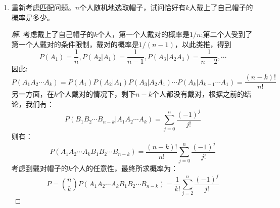 \documentclass[12pt]{article}
\newcommand{\hei}{\CJKfamily{hei}}                          %
\begin{document}
\begin{enumerate}
\item {\hei 重新考虑匹配问题。$n$个人随机地选取帽子，试问恰好有$k$人戴上了自己帽子的概率是多少。}
\begin{proof}[解]
	考虑戴上了自己帽子的$k$个人，第一个人戴对的概率是$1/n$;第二个人受到了第一个人戴对的条件限制，戴对的概率是$1/(n−1)$，以此类推，得到
	\begin{equation}
	P(A_1)=\frac{1}{n},P(A_2|A_1)=\frac{1}{n-1},P(A_3|A_2A_1)=\frac{1}{n-2},\cdots
	\end{equation}
	因此:
	\begin{equation}
	P(A_1A_2\cdots A_k)=P(A_1)P(A_2|A_1)P(A_3|A_2A_1)\cdots P(A_k|A_{k-1}\cdots A_1)=\frac{(n-k)!}{n!}
	\end{equation}
	另一方面，在$k$个人戴对的情况下，剩下$n-k$个人都没有戴对，根据之前的结论，我们有：
	\begin{equation}
	P(B_1B_2\cdots B_{n-k}|A_1A_2\cdots A_k)=\sum_{j=0}^{n}\frac{(-1)^{j}}{j!}
	\end{equation}
	则有：
	\begin{equation}
	P(A_1A_2\cdots A_kB_1B_2\cdots B_{n-k})=\frac{(n-k)!}{n!}\sum_{j=0}^{n}\frac{(-1)^{j}}{j!}
	\end{equation}
	考虑到戴对帽子的$k$个人的任意性，最终所求概率为：
	\begin{equation}
	P=\binom{n}{k}P(A_1A_2\cdots A_kB_1B_2\cdots B_{n-k})=\frac{1}{k!}\sum_{j=2}^{n}\frac{(-1)^{j}}{j!}
	\end{equation}
\end{proof}


\end{enumerate}
\end{document}
